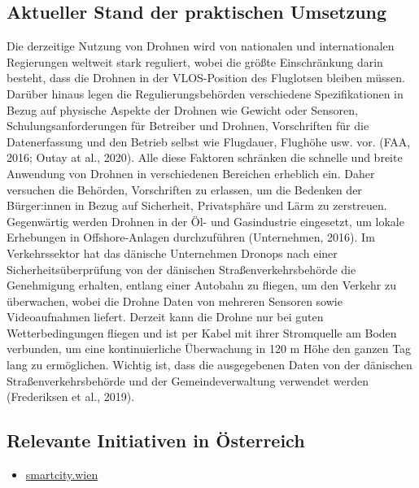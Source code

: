 \documentclass[
]{book}
\providecommand{\tightlist}{%
  \setlength{\itemsep}{0pt}\setlength{\parskip}{0pt}}
\begin{document}
\hypertarget{aktueller-stand-der-praktischen-umsetzung-7}{%
\subsection*{Aktueller Stand der praktischen Umsetzung}\label{aktueller-stand-der-praktischen-umsetzung-7}}

Die derzeitige Nutzung von Drohnen wird von nationalen und internationalen Regierungen weltweit stark reguliert, wobei die größte Einschränkung darin besteht, dass die Drohnen in der VLOS-Position des Fluglotsen bleiben müssen. Darüber hinaus legen die Regulierungsbehörden verschiedene Spezifikationen in Bezug auf physische Aspekte der Drohnen wie Gewicht oder Sensoren, Schulungsanforderungen für Betreiber und Drohnen, Vorschriften für die Datenerfassung und den Betrieb selbst wie Flugdauer, Flughöhe usw. vor. (FAA, 2016; Outay at al., 2020). Alle diese Faktoren schränken die schnelle und breite Anwendung von Drohnen in verschiedenen Bereichen erheblich ein. Daher versuchen die Behörden, Vorschriften zu erlassen, um die Bedenken der Bürger:innen in Bezug auf Sicherheit, Privatsphäre und Lärm zu zerstreuen. Gegenwärtig werden Drohnen in der Öl- und Gasindustrie eingesetzt, um lokale Erhebungen in Offshore-Anlagen durchzuführen (Unternehmen, 2016). Im Verkehrssektor hat das dänische Unternehmen Dronops nach einer Sicherheitsüberprüfung von der dänischen Straßenverkehrsbehörde die Genehmigung erhalten, entlang einer Autobahn zu fliegen, um den Verkehr zu überwachen, wobei die Drohne Daten von mehreren Sensoren sowie Videoaufnahmen liefert. Derzeit kann die Drohne nur bei guten Wetterbedingungen fliegen und ist per Kabel mit ihrer Stromquelle am Boden verbunden, um eine kontinuierliche Überwachung in 120 m Höhe den ganzen Tag lang zu ermöglichen. Wichtig ist, dass die ausgegebenen Daten von der dänischen Straßenverkehrsbehörde und der Gemeindeverwaltung verwendet werden (Frederiksen et al., 2019).

\hypertarget{relevante-initiativen-in-uxf6sterreich-7}{%
\subsection*{Relevante Initiativen in Österreich}\label{relevante-initiativen-in-uxf6sterreich-7}}

\begin{itemize}
\tightlist
\item
  \href{https://smartcity.wien.gv.at/site/en/smart-inspection/}{smartcity.wien}
\end{itemize}
\end{document}
